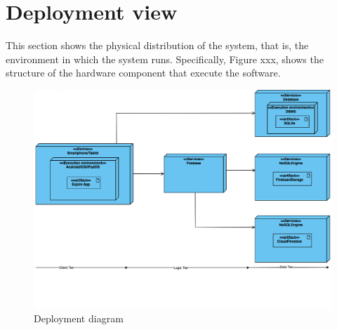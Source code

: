 \section{Deployment view}
This section shows the physical distribution of the system, that is, the environment in which the system runs. Specifically, Figure xxx, shows the structure of the hardware component that execute the software.

\begin{figure}[H]
  \hspace*{-2cm}\includegraphics[scale=0.45]{./Images/Deployment.png}
  \caption{Deployment diagram}
\end{figure}